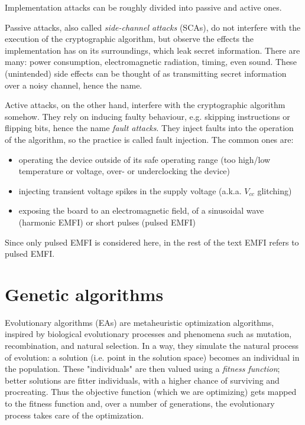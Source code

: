 \documentclass[times, utf8, diplomski]{fer}
\begin{document}
Implementation attacks can be roughly divided into passive and active ones.

Passive attacks, also called \emph{side-channel attacks} (SCAs), do not interfere
with the execution of the cryptographic algorithm, but observe the effects the
implementation has on its surroundings, which leak secret information.
There are many: power consumption, electromagnetic radiation, timing, even sound. %
These (unintended) side effects can be thought of as transmitting secret
information over a noisy channel, hence the name.

Active attacks, on the other hand, interfere with the cryptographic algorithm
somehow. They rely on inducing faulty behaviour, e.g. skipping instructions or
flipping bits, hence the name \emph{fault attacks}. They inject faults into the
operation of the algorithm, so the practice is called fault injection.
The common ones are:
\begin{itemize}
  \item operating the device outside of its safe operating range
        (too high/low temperature or voltage, over- or underclocking the device)
  \item injecting transient voltage spikes in the supply voltage (a.k.a. $V_{cc}$ glitching)
  \item exposing the board to an electromagnetic field, of a sinusoidal wave (harmonic EMFI)
        or short pulses (pulsed EMFI)
\end{itemize}


Since only pulsed EMFI is considered here, in the rest of the text EMFI refers
to pulsed EMFI.


\section{Genetic algorithms}\label{sec:GAs}
Evolutionary algorithms (EAs) are metaheuristic optimization algorithms,
inspired by biological evolutionary processes and phenomena such as mutation,
recombination, and natural selection.
In a way, they simulate the natural process of evolution: a solution
(i.e. point in the solution space) becomes an individual in the population.
These "individuals" are then valued using a \emph{fitness function}; better
solutions are fitter individuals, with a higher chance of surviving and procreating.
Thus the objective function (which we are optimizing) gets mapped to the fitness function
and, over a number of generations, the evolutionary process takes care of the optimization.
\end{document}
